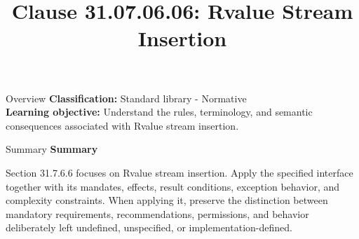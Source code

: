\documentclass[10pt,letterpaper]{article}
\title{Clause 31.07.06.06: Rvalue Stream Insertion}
\author{}
\date{}
\begin{document}
\maketitle
\begin{CornellOverviewBox}{Overview}
\textbf{Classification:} Standard library - Normative\\[2pt]
\textbf{Learning objective:} Understand the rules, terminology, and semantic consequences associated with Rvalue stream insertion.
\end{CornellOverviewBox}\begin{CornellSummaryBox}{Summary}
{\sffamily\bfseries\color{Accent} Summary}\par\vspace{3pt}Section 31.7.6.6 focuses on Rvalue stream insertion. Apply the specified interface together with its mandates, effects, result conditions, exception behavior, and complexity constraints. When applying it, preserve the distinction between mandatory requirements, recommendations, permissions, and behavior deliberately left undefined, unspecified, or implementation-defined.
\end{CornellSummaryBox}
\end{document}
